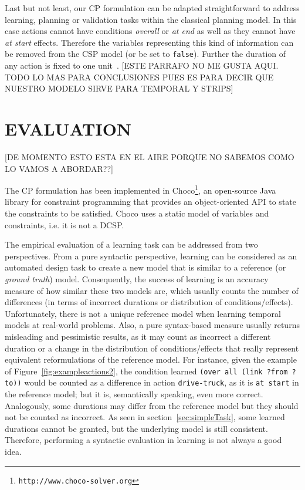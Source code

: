 \documentclass{ecai}
\begin{document}
Last but not least, our CP formulation can be adapted straightforward to address learning, planning or validation tasks within the classical planning model. In this case actions cannot have conditions {\em overall} or {\em at end} as well as they cannot have {\em at start} effects. Therefore the variables representing this kind of information can be removed from the CSP model (or be set to {\tt false}). Further the duration of any action is fixed to one unit~\cite{jimenez2015temporal}.  [ESTE PARRAFO NO ME GUSTA AQUI. TODO LO MAS PARA CONCLUSIONES PUES ES PARA DECIR QUE NUESTRO MODELO SIRVE PARA TEMPORAL Y STRIPS]


\section{EVALUATION}
\label{sec:evaluation}

[DE MOMENTO ESTO ESTA EN EL AIRE PORQUE NO SABEMOS COMO LO VAMOS A ABORDAR??]

The CP formulation has been implemented in \textsf{Choco}\footnote{\texttt{http://www.choco-solver.org}}, an open-source Java library for constraint programming that provides an object-oriented API to state the constraints to be satisfied. \textsf{Choco} uses a static model of variables and constraints, i.e. it is not a DCSP.

The empirical evaluation of a learning task can be addressed from two perspectives. From a pure syntactic perspective, learning can be considered as an automated design task to create a new model that is similar to a reference (or {\em ground truth}) model. Consequently, the success of learning is an accuracy measure of how similar these two models are, which usually counts the number of differences (in terms of incorrect durations or distribution of conditions/effects). Unfortunately, there is not a unique reference model when learning temporal models at real-world problems. Also, a pure syntax-based measure usually returns misleading and pessimistic results, as it may count as incorrect a different duration or a change in the distribution of conditions/effects that really represent equivalent reformulations of the reference model. For instance, given the example of Figure~\ref{fig:exampleactions2}, the condition learned \texttt{(over all (link ?from ?to))} would be counted as a difference in action \texttt{drive-truck}, as it is \texttt{at start} in the reference model; but it is, semantically speaking, even more correct. Analogously, some durations may differ from the reference model but they should not be counted as incorrect. As seen in section~\ref{sec:simpleTask}, some learned durations cannot be granted, but the underlying model is still consistent. Therefore, performing a syntactic evaluation in learning is not always a good idea.
\end{document}
